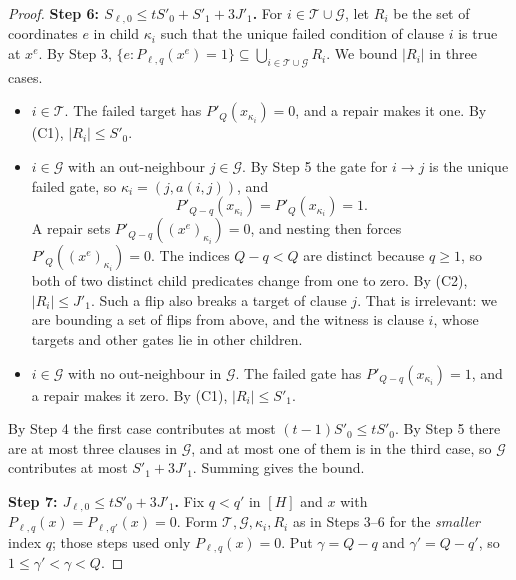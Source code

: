 \documentclass[11pt]{article}
\theoremstyle{definition}
\theoremstyle{remark}
\begin{document}
\begin{proof}
\medskip\noindent\textbf{Step 6: \(S_{\ell,0}\le tS'_0+S'_1+3J'_1\).}
For \(i\in\mathcal T\cup\mathcal G\), let \(R_i\) be the set of coordinates
\(e\) in child \(\kappa_i\) such that the unique failed condition of clause
\(i\) is true at \(x^e\). By Step 3,
\(\{e:P_{\ell,q}(x^e)=1\}\subseteq\bigcup_{i\in\mathcal T\cup\mathcal G}R_i\).
We bound \(|R_i|\) in three cases.
\begin{itemize}[leftmargin=2em]
\item \(i\in\mathcal T\). The failed target has \(P'_Q(x_{\kappa_i})=0\), and
a repair makes it one. By (C1), \(|R_i|\le S'_0\).
\item \(i\in\mathcal G\) with an out-neighbour \(j\in\mathcal G\). By Step 5
the gate for \(i\to j\) is the unique failed gate, so
\(\kappa_i=(j,a(i,j))\), and
\[
 P'_{Q-q}(x_{\kappa_i})=P'_Q(x_{\kappa_i})=1 .
\]
A repair sets \(P'_{Q-q}((x^e)_{\kappa_i})=0\), and nesting then forces
\(P'_Q((x^e)_{\kappa_i})=0\). The indices \(Q-q<Q\) are distinct because
\(q\ge1\), so both of two distinct child predicates change from one to zero.
By (C2), \(|R_i|\le J'_1\). Such a flip also breaks a target of clause \(j\).
That is irrelevant: we are bounding a set of flips from above, and the
witness is clause \(i\), whose targets and other gates lie in other children.
\item \(i\in\mathcal G\) with no out-neighbour in \(\mathcal G\). The failed
gate has \(P'_{Q-q}(x_{\kappa_i})=1\), and a repair makes it zero. By (C1),
\(|R_i|\le S'_1\).
\end{itemize}
By Step 4 the first case contributes at most \((t-1)S'_0\le tS'_0\). By Step 5
there are at most three clauses in \(\mathcal G\), and at most one of them is in the third
case, so \(\mathcal G\) contributes at most \(S'_1+3J'_1\). Summing gives the
bound.

\medskip\noindent\textbf{Step 7: \(J_{\ell,0}\le tS'_0+3J'_1\).}
Fix \(q<q'\) in \([H]\) and \(x\) with
\(P_{\ell,q}(x)=P_{\ell,q'}(x)=0\). Form \(\mathcal T,\mathcal G,\kappa_i,R_i\)
as in Steps 3--6 for the \emph{smaller} index \(q\); those steps used only
\(P_{\ell,q}(x)=0\). Put \(\gamma=Q-q\) and \(\gamma'=Q-q'\), so
\(1\le\gamma'<\gamma<Q\).


\end{proof}
\end{document}
